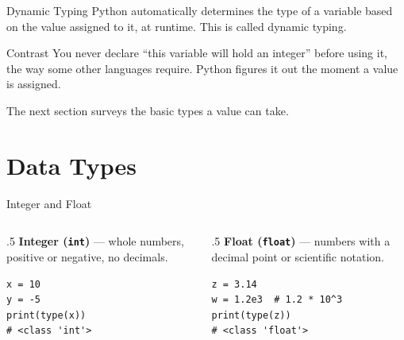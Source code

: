 \documentclass[9pt,aspectratio=169,xcolor=table]{beamer}
\begin{document}
\begin{frame}{Dynamic Typing}
    \leavevmode
    Python automatically determines the type of a variable based on the
    value assigned to it, \alert{at runtime}. This is called
    \alert{dynamic typing}.

    \vspace{3mm}
    \begin{block}{Contrast}
        \small You never declare ``this variable will hold an integer''
        before using it, the way some other languages require. Python
        figures it out the moment a value is assigned.
    \end{block}

    \vspace{3mm}
    {\small The next section surveys the basic types a value can take.}
\end{frame}

\section{Data Types}

\begin{frame}[fragile]{Integer and Float}
    \leavevmode
    \begin{columns}[t]
        \begin{column}{.5\textwidth}
            \textbf{Integer (\texttt{int})} --- whole numbers, positive or
            negative, no decimals.
\begin{lstlisting}
x = 10
y = -5
print(type(x))
# <class 'int'>
\end{lstlisting}
        \end{column}
        \begin{column}{.5\textwidth}
            \textbf{Float (\texttt{float})} --- numbers with a decimal
            point or scientific notation.
\begin{lstlisting}
z = 3.14
w = 1.2e3  # 1.2 * 10^3
print(type(z))
# <class 'float'>
\end{lstlisting}
        \end{column}
    \end{columns}
\end{frame}
\end{document}
